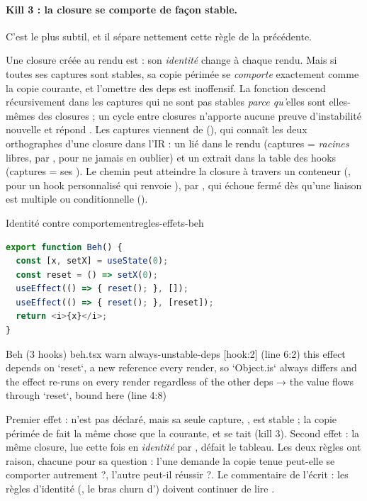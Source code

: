 \paragraph{Kill 3 : la closure se comporte de façon stable.} C'est le plus subtil, et il sépare nettement cette règle de la précédente.


Une closure créée au rendu est  : son \emph{identité} change à chaque rendu. Mais si toutes ses captures sont stables, sa copie périmée se \emph{comporte} exactement comme la copie courante, et l'omettre des deps est inoffensif. La fonction descend récursivement dans les captures qui ne sont pas stables \emph{parce qu'}elles sont elles-mêmes des closures ; un cycle entre closures n'apporte aucune preuve d'instabilité nouvelle et répond . Les captures viennent de  (), qui connaît les deux orthographes d'une closure dans l'IR : un  lié dans le rendu (captures = \emph{racines} libres, par , pour ne jamais en oublier) et un  extrait dans la table des hooks (captures = ses ). Le chemin peut atteindre la closure à travers un conteneur (, pour un hook personnalisé qui renvoie ), par , qui échoue fermé dès qu'une liaison est multiple ou conditionnelle ().

\begin{exemple}{Identité contre comportement}{regles-effets-beh}
\begin{lstlisting}[language=TypeScript]
export function Beh() {
  const [x, setX] = useState(0);
  const reset = () => setX(0);
  useEffect(() => { reset(); }, []);
  useEffect(() => { reset(); }, [reset]);
  return <i>{x}</i>;
}
\end{lstlisting}
\begin{sortie}
  Beh  (3 hooks)  beh.tsx
    warn   always-unstable-deps  [hook:2]  (line 6:2)  this effect depends on `reset`, a new reference every render, so `Object.is` always differs and the effect re-runs on every render regardless of the other deps
       → the value flows through `reset`, bound here (line 4:8)
\end{sortie}
Premier effet :  n'est pas déclaré, mais sa seule capture, , est stable ; la copie périmée de  fait la même chose que la courante, et  se tait (kill 3). Second effet : la même closure, lue cette fois en \emph{identité} par , défait le tableau. Les deux règles ont raison, chacune pour sa question : l'une demande \og la copie tenue peut-elle se comporter autrement ?\fg{}, l'autre \og {} peut-il réussir ?\fg{}. Le commentaire de  l'écrit : les règles d'identité (, le bras churn d') doivent continuer de lire .
\end{exemple}

